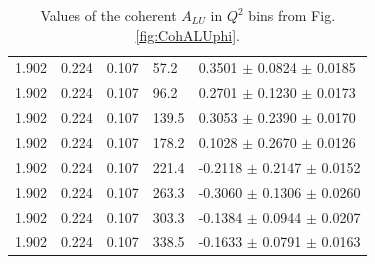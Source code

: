 \documentclass{article}
\begin{document}
\begin{table}[!h]
\begin{center}
\begin{tabular}{||l|l|l|l|l||}
  1.902 & 0.224 & 0.107 & 57.2  &  0.3501 $\pm$ 0.0824 $\pm$ 0.0185 \\ 
  1.902 & 0.224 & 0.107 & 96.2  &  0.2701 $\pm$ 0.1230 $\pm$ 0.0173 \\ 
  1.902 & 0.224 & 0.107 & 139.5 &  0.3053 $\pm$ 0.2390 $\pm$ 0.0170 \\ 
  1.902 & 0.224 & 0.107 & 178.2 &  0.1028 $\pm$ 0.2670 $\pm$ 0.0126 \\ 
  1.902 & 0.224 & 0.107 & 221.4 & -0.2118 $\pm$ 0.2147 $\pm$ 0.0152 \\ 
  1.902 & 0.224 & 0.107 & 263.3 & -0.3060 $\pm$ 0.1306 $\pm$ 0.0260 \\ 
  1.902 & 0.224 & 0.107 & 303.3 & -0.1384 $\pm$ 0.0944 $\pm$ 0.0207 \\ 
  1.902 & 0.224 & 0.107 & 338.5 & -0.1633 $\pm$ 0.0791 $\pm$ 0.0163 \\ 
         \hline \hline
      \end{tabular}
      \caption{Values of the coherent $A_{LU}$ in $Q^2$ bins from Fig. \ref{fig:CohALUphi}.}
      \label{table:Coh_Q2_BSA}
   \end{center}
\end{table}                    
\end{document}
